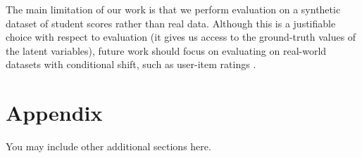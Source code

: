 \documentclass{article} %
\begin{document}
The main limitation of our work is that we perform evaluation on a synthetic dataset of student scores rather than real data. Although this is a justifiable choice with respect to evaluation (it gives us access to the ground-truth values of the latent variables), future work should focus on evaluating on real-world datasets with conditional shift, such as user-item ratings \citep{Koren2009MatrixFT}.





\appendix
\section{Appendix}
You may include other additional sections here.
\end{document}
